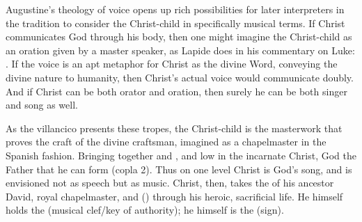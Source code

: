 
Augustine's theology of voice opens up rich possibilities for later interpreters
in the tradition to consider the Christ-child in specifically musical terms.
If Christ communicates God through his body, then one might imagine the
Christ-child as an oration given by a master speaker, as Lapide does in his
commentary on Luke:
.%
    \Autocite[673, on ]{Lapide:Gospels19C} 
If the voice is an apt metaphor for Christ as the divine Word, conveying the
divine nature to humanity, then Christ's actual voice would communicate doubly.
And if Christ can be both orator and oration, then surely he can be both singer
and song as well.


As the villancico  presents these tropes, the
Christ-child is the masterwork that proves the craft of the divine craftsman,
imagined as a chapelmaster in the Spanish fashion.
Bringing together  and ,  and low
in the incarnate Christ, God the Father  that he can form
 (copla 2).
Thus on one level Christ is God's song, and  is envisioned not
as speech but as music.
Christ, then, takes the  of his ancestor David, royal
chapelmaster, and  () through his
heroic, sacrificial life.
He himself holds the  (musical clef/key of authority); he
himself is the  (sign).

